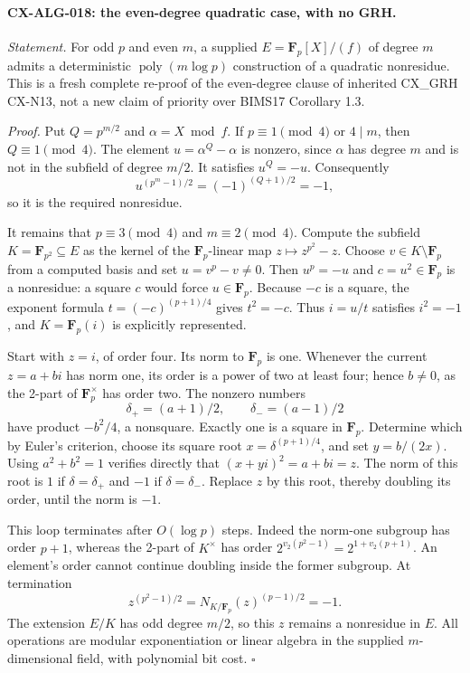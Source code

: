 \paragraph{CX-ALG-018: the even-degree quadratic case, with no GRH.}
\emph{Statement.} For odd $p$ and even $m$, a supplied
$E=\mathbf F_p[X]/(f)$ of degree $m$ admits a deterministic
$\operatorname{poly}(m\log p)$ construction of a quadratic nonresidue.
This is a fresh complete re-proof of the even-degree clause of inherited
CX\_GRH CX-N13, not a new claim of priority over BIMS17 Corollary 1.3.

\emph{Proof.} Put $Q=p^{m/2}$ and $\alpha=X\bmod f$.
If $p\equiv1\pmod4$ or $4\mid m$, then $Q\equiv1\pmod4$.
The element $u=\alpha^Q-\alpha$ is nonzero, since $\alpha$ has degree
$m$ and is not in the subfield of degree $m/2$. It satisfies $u^Q=-u$.
Consequently
\[
       u^{(p^m-1)/2}=(-1)^{(Q+1)/2}=-1,
\]
so it is the required nonresidue.

It remains that $p\equiv3\pmod4$ and $m\equiv2\pmod4$.
Compute the subfield $K=\mathbf F_{p^2}\subseteq E$ as the kernel of
the $\mathbf F_p$-linear map $z\mapsto z^{p^2}-z$.
Choose $v\in K\setminus\mathbf F_p$ from a computed basis and set
$u=v^p-v\ne0$. Then $u^p=-u$ and $c=u^2\in\mathbf F_p$ is a
nonresidue: a square $c$ would force $u\in\mathbf F_p$.
Because $-c$ is a square, the exponent formula
$t=(-c)^{(p+1)/4}$ gives $t^2=-c$. Thus $i=u/t$ satisfies $i^2=-1$,
and $K=\mathbf F_p(i)$ is explicitly represented.

Start with $z=i$, of order four. Its norm to $\mathbf F_p$ is one.
Whenever the current $z=a+bi$ has norm one, its order is a power of two
at least four; hence $b\ne0$, as the 2-part of $\mathbf F_p^\times$ has
order two. The nonzero numbers
\[
                 \delta_+=(a+1)/2,\qquad \delta_-=(a-1)/2
\]
have product $-b^2/4$, a nonsquare. Exactly one is a square in
$\mathbf F_p$. Determine which by Euler's criterion, choose its square
root $x=\delta^{(p+1)/4}$, and set $y=b/(2x)$.
Using $a^2+b^2=1$ verifies directly that
$(x+yi)^2=a+bi=z$. The norm of this root is $1$ if
$\delta=\delta_+$ and $-1$ if $\delta=\delta_-$.
Replace $z$ by this root, thereby doubling its order, until the norm is
$-1$.

This loop terminates after $O(\log p)$ steps. Indeed the norm-one subgroup
has order $p+1$, whereas the 2-part of $K^\times$ has order
$2^{v_2(p^2-1)}=2^{1+v_2(p+1)}$. An element's order cannot continue
doubling inside the former subgroup. At termination
\[
        z^{(p^2-1)/2}
          =N_{K/\mathbf F_p}(z)^{(p-1)/2}=-1.
\]
The extension $E/K$ has odd degree $m/2$, so this $z$ remains a nonresidue
in $E$. All operations are modular exponentiation or linear algebra in
the supplied $m$-dimensional field, with polynomial bit cost.
\hfill$\square$

